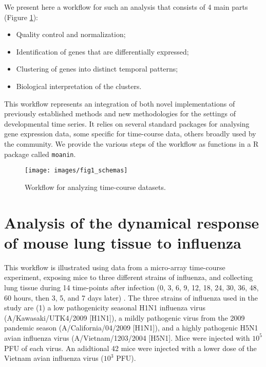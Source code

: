 \documentclass[9pt,a4paper,]{extarticle}
\begin{document}
We present here a workflow for such an analysis that consists of 4 main
parts (Figure \ref{fig:schema}):

\begin{itemize}
\tightlist
\item
  Quality control and normalization;
\item
  Identification of genes that are differentially expressed;
\item
  Clustering of genes into distinct temporal patterns;
\item
  Biological interpretation of the clusters.
\end{itemize}

This workflow represents an integration of both novel implementations of
previously established methods and new methodologies for the settings of
developmental time series. It relies on several standard packages for
analysing gene expression data, some specific for time-course data, others
broadly used by the community. We provide the various steps of the workflow as
functions in a R package called \texttt{moanin}.

\begin{figure}

{\centering \texttt{[image: images/fig1\_schemas]} 

}

\caption{Workflow for analyzing time-course datasets.}\label{fig:schema}
\end{figure}

\hypertarget{analysis-of-the-dynamical-response-of-mouse-lung-tissue-to-influenza}{%
\section{Analysis of the dynamical response of mouse lung tissue to influenza}\label{analysis-of-the-dynamical-response-of-mouse-lung-tissue-to-influenza}}

This workflow is illustrated using data from a micro-array time-course
experiment, exposing mice to three different strains of influenza, and
collecting lung tissue during 14 time-points after infection (0, 3, 6, 9, 12,
18, 24, 30, 36, 48, 60 hours, then 3, 5, and 7 days later)
\citep{shoemaker:ultrasensitive}. The three strains of influenza used in the
study are (1) a low pathogenicity seasonal H1N1 influenza virus
(A/Kawasaki/UTK4/2009 {[}H1N1{]}), a mildly pathogenic virus from the 2009
pandemic season (A/California/04/2009 {[}H1N1{]}), and a highly pathogenic H5N1
avian influenza virus (A/Vietnam/1203/2004 {[}H5N1{]}. Mice were injected with
\(10^5\) PFU of each virus. An adidtional 42 mice were injected with a lower dose
of the Vietnam avian influenza virus (\(10^3\) PFU).
\end{document}
